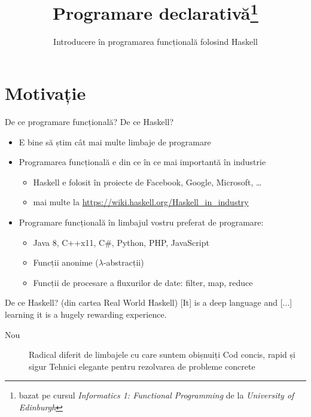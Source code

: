 \documentclass[xcolor=pdftex,romanian,colorlinks]{beamer}
\title[PD---Introducere]{Programare declarativă\thanks{bazat pe cursul \emph{Informatics 1: Functional Programming} de la \emph{University of Edinburgh}}}
\subtitle{Introducere în programarea funcțională folosind Haskell}
\begin{document}
\begin{frame}
  \titlepage
\end{frame}

\section{Motivație}
\begin{frame}{De ce programare funcțională? De ce Haskell?}
\begin{itemize}
\item E bine să știm cât mai multe limbaje de programare
\item Programarea funcțională e din ce în ce mai importantă în industrie
\begin{itemize}
\item Haskell e folosit în proiecte de Facebook, Google, Microsoft, \ldots
\item mai multe la \url{https://wiki.haskell.org/Haskell_in_industry}
\end{itemize} 
\item Programare funcțională în limbajul vostru preferat de programare:

\begin{itemize}
\item  Java 8, C++x11, C\#, Python, PHP, JavaScript 
\item Funcții anonime ($\lambda$-abstracții)
\item Funcții de procesare a fluxurilor de date: filter, map, reduce
\end{itemize}
\end{itemize}

\begin{block}{De ce Haskell? (din cartea Real World Haskell)}
 [It] is a deep language and [...] learning it is a hugely rewarding experience.
\end{block}
\begin{description}
\item[Nou] Radical diferit de limbajele cu care suntem obișnuiți
\vitem[Puternic] Cod concis, rapid și sigur
\vitem[Plăcut] Tehnici elegante pentru rezolvarea de probleme concrete
\end{description}
\end{frame}
\end{document}

